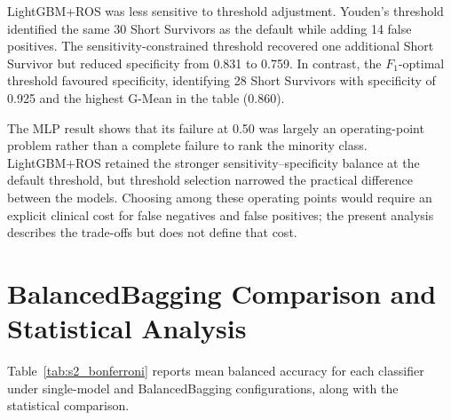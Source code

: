 LightGBM+ROS was less sensitive to threshold adjustment. Youden's threshold identified the same 30 Short Survivors as the default while adding 14 false positives. The sensitivity-constrained threshold recovered one additional Short Survivor but reduced specificity from 0.831 to 0.759. In contrast, the $F_1$-optimal threshold favoured specificity, identifying 28 Short Survivors with specificity of 0.925 and the highest G-Mean in the table (0.860).

The MLP result shows that its failure at 0.50 was largely an operating-point problem rather than a complete failure to rank the minority class. LightGBM+ROS retained the stronger sensitivity--specificity balance at the default threshold, but threshold selection narrowed the practical difference between the models. Choosing among these operating points would require an explicit clinical cost for false negatives and false positives; the present analysis describes the trade-offs but does not define that cost.

\section{BalancedBagging Comparison and Statistical Analysis}
\label{sec:s2r_bagging}

Table~\ref{tab:s2_bonferroni} reports mean balanced accuracy for each classifier under single-model and BalancedBagging configurations, along with the statistical comparison.

